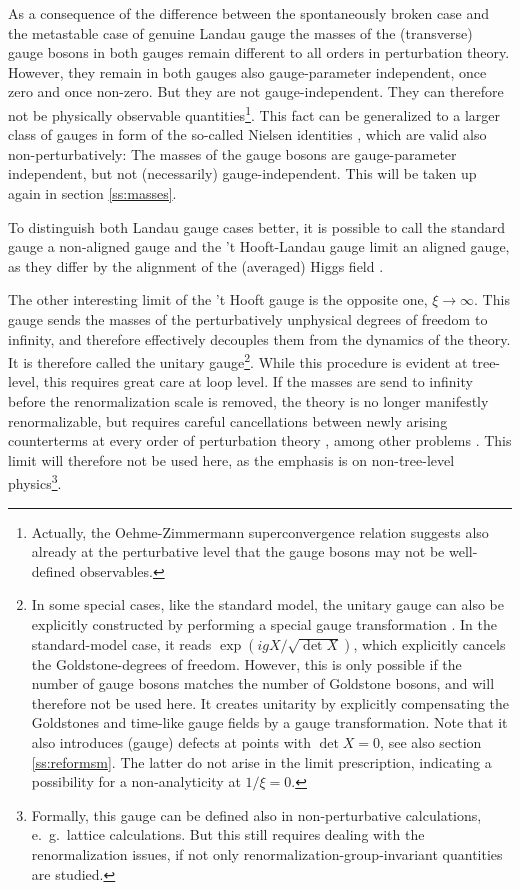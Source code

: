 \documentclass[final,12pt,3p,longtitle]{elsarticle}
\newcommand*{\1}{1\!\!\!\bot}
\begin{document}
As a consequence of the difference between the spontaneously broken case and the metastable case of genuine Landau gauge the masses of the (transverse) gauge bosons in both gauges remain different to all orders in perturbation theory. However, they remain in both gauges also gauge-parameter independent, once zero and once non-zero. But they are not gauge-independent. They can therefore not be physically observable quantities\footnote{Actually, the Oehme-Zimmermann superconvergence relation \cite{Oehme:1979ai} suggests also already at the perturbative level that the gauge bosons may not be well-defined observables.}. This fact can be generalized to a larger class of gauges in form of the so-called Nielsen identities \cite{Nielsen:1975fs}, which are valid also non-perturbatively: The masses of the gauge bosons are gauge-parameter independent, but not (necessarily) gauge-independent. This will be taken up again in section \ref{ss:masses}.

To distinguish both Landau gauge cases better, it is possible to call the standard gauge a non-aligned gauge and the 't Hooft-Landau gauge limit an aligned gauge, as they differ by the alignment of the (averaged) Higgs field \cite{Maas:2012ct}. 

The other interesting limit of the 't Hooft gauge is the opposite one, $\xi\to\infty$. This gauge sends the masses of the perturbatively unphysical degrees of freedom to infinity, and therefore effectively decouples them from the dynamics of the theory. It is therefore called the unitary gauge\footnote{In some special cases, like the standard model, the unitary gauge can also be explicitly constructed by performing a special gauge transformation \cite{Bohm:2001yx}. In the standard-model case, it reads $\exp(ig X/\sqrt{\det X})$, which explicitly cancels the Goldstone-degrees of freedom. However, this is only possible if the number of gauge bosons matches the number of Goldstone bosons, and will therefore not be used here. It creates unitarity by explicitly compensating the Goldstones and time-like gauge fields by a gauge transformation. Note that it also introduces (gauge) defects at points with $\det X=0$, see also section \ref{ss:reformsm}. The latter do not arise in the limit prescription, indicating a possibility for a non-analyticity at $1/\xi=0$.}. While this procedure is evident at tree-level, this requires great care at loop level. If the masses are send to infinity before the renormalization scale is removed, the theory is no longer manifestly renormalizable, but requires careful cancellations between newly arising counterterms at every order of perturbation theory \cite{Bohm:2001yx,Weinberg:1971fb,Lee:1973fw,Lee:1973xp,Appelquist:1972tn,Irges:2017ztc}, among other problems \cite{Bohm:2001yx,Bars:1972pe,Jackiw:1972jz}. This limit will therefore not be used here, as the emphasis is on non-tree-level physics\footnote{Formally, this gauge can be defined also in non-perturbative calculations, e.\ g.\ lattice calculations. But this still requires dealing with the renormalization issues, if not only renormalization-group-invariant quantities are studied.}.
\end{document}
